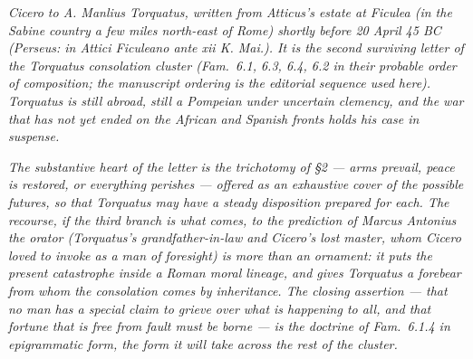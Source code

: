 
\textit{Cicero to A. Manlius Torquatus, written from Atticus's
estate at Ficulea (in the Sabine country a few miles north-east
of Rome) shortly before 20 April 45 BC (Perseus: \textit{in
Attici Ficuleano ante xii K. Mai.}). It is the second surviving
letter of the Torquatus consolation cluster (\textit{Fam.}~6.1,
6.3, 6.4, 6.2 in their probable order of composition; the
manuscript ordering is the editorial sequence used here).
Torquatus is still abroad, still a Pompeian under uncertain
clemency, and the war that has not yet ended on the African and
Spanish fronts holds his case in suspense.}

\textit{The substantive heart of the letter is the trichotomy of
\S2 --- arms prevail, peace is restored, or everything perishes
--- offered as an exhaustive cover of the possible futures, so
that Torquatus may have a steady disposition prepared for each.
The recourse, if the third branch is what comes, to the
prediction of Marcus Antonius the orator (Torquatus's
grandfather-in-law and Cicero's lost master, whom Cicero loved
to invoke as a man of foresight) is more than an ornament: it
puts the present catastrophe inside a Roman moral lineage, and
gives Torquatus a forebear from whom the consolation comes by
inheritance. The closing assertion --- that no man has a special
claim to grieve over what is happening to all, and that fortune
that is free from fault must be borne --- is the doctrine of
\textit{Fam.}~6.1.4 in epigrammatic form, the form it will
take across the rest of the cluster.}
